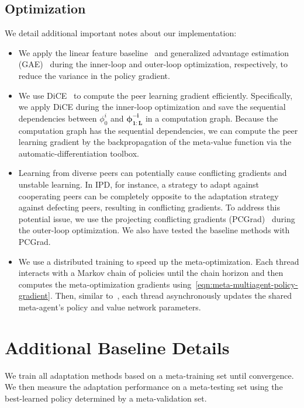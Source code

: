 \subsection{Optimization}\label{sec:optimization-details}
We detail additional important notes about our implementation:
\begin{itemize}[leftmargin=*, wide, labelindent=0pt, topsep=0pt]
    \itemsep0pt
    \item We apply the linear feature baseline~\citep{duan-16-linearbaseline} and generalized advantage estimation (GAE)~\citep{schulmanetal-16-gae} during the inner-loop and outer-loop optimization, respectively, to reduce the variance in the policy gradient. 
    
    \item We use DiCE~\citep{foerster2018dice} to compute the peer learning gradient efficiently. Specifically, we apply DiCE during the inner-loop optimization and save the sequential dependencies between $\phi^{i}_{0}$ and $\bm{\phi}^{\bm{-i}}_{\bm{1:L}}$ in a computation graph. 
    Because the computation graph has the sequential dependencies, we can compute the peer learning gradient by the backpropagation of the meta-value function via the automatic-differentiation toolbox.
    
    \item Learning from diverse peers can potentially cause conflicting gradients and unstable learning. 
    In IPD, for instance, a strategy to adapt against cooperating peers can be completely opposite to the adaptation strategy against defecting peers, resulting in conflicting gradients.
    To address this potential issue, we use the projecting conflicting gradients (PCGrad)~\citep{yu20pcgrad} during the outer-loop optimization. We also have tested the baseline methods with PCGrad.%
    
    \item We use a distributed training to speed up the meta-optimization. 
    Each thread interacts with a Markov chain of policies until the chain horizon and then computes the meta-optimization gradients using~\cref{eqn:meta-multiagent-policy-gradient}. Then, similar to~\citet{mniha16A3C}, each thread asynchronously updates the shared meta-agent's policy and value network parameters. 
\end{itemize}

\section{Additional Baseline Details}\label{sec:baseline-details}
We train all adaptation methods based on a meta-training set until convergence. 
We then measure the adaptation performance on a meta-testing set using the best-learned policy determined by a meta-validation set.

